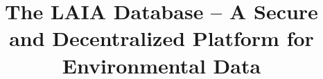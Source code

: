 \documentclass[conference,final,]{IEEEtran}
\begin{document}
%
\title{The LAIA Database -- A Secure and Decentralized Platform for
Environmental Data}


\author{




\IEEEauthorblockN{
}






}


%
\end{document}
